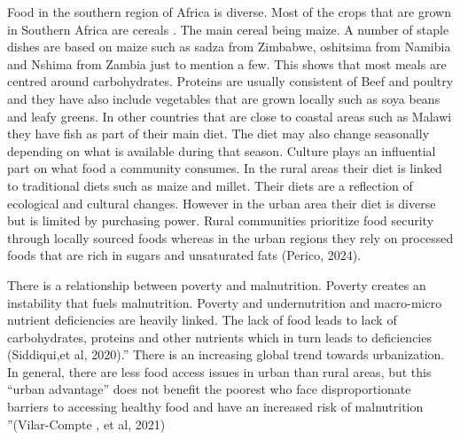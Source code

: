 \documentclass[a4paper,11pt]{report}
\begin{document}
	Food in the southern region of Africa is diverse. Most of the crops that are grown in Southern Africa are cereals . The main cereal being maize. A number of staple dishes are based on maize such as sadza from Zimbabwe, oshitsima from Namibia and Nshima from Zambia just to mention a few. This shows that most meals are centred around carbohydrates. Proteins are usually consistent of Beef and poultry and they have also include vegetables that are grown locally such as soya beans and leafy greens. In other countries that are close to coastal areas such as Malawi they have fish as part of their main diet. The diet may also change seasonally depending on what is available during that season. Culture plays an influential part on what food a community consumes. In the rural areas their diet is linked to traditional diets such as maize and millet. Their diets are a reflection of ecological and cultural changes. However in the urban area their diet is diverse but is limited by purchasing power. Rural communities prioritize food security through locally sourced foods whereas in the urban regions they rely on processed foods that are rich in sugars and unsaturated fats (Perico, 2024).\par
	There is a relationship between poverty and malnutrition. Poverty creates an instability that fuels malnutrition. Poverty and undernutrition and macro-micro nutrient deficiencies are heavily linked. The lack of food leads to lack of carbohydrates, proteins and other nutrients which in turn leads to deficiencies (Siddiqui,et al, 2020).” There is an increasing global trend towards urbanization. In general, there are less food access issues in urban than rural areas, but this “urban advantage” does not benefit the poorest who face disproportionate barriers to accessing healthy food and have an increased risk of malnutrition ”(Vilar-Compte , et al, 2021)\par
\end{document}
